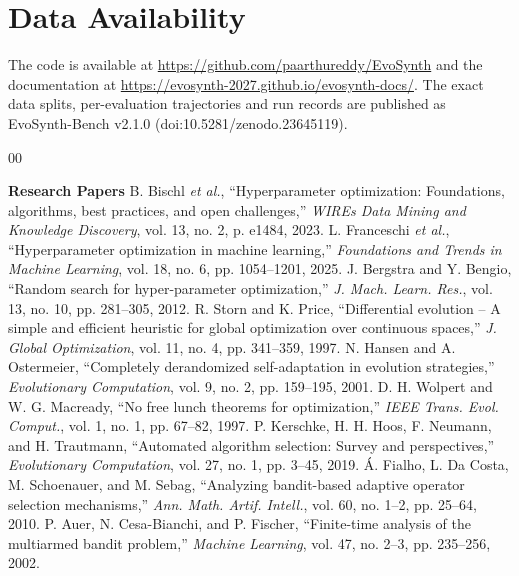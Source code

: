 \documentclass[conference]{IEEEtran}
\begin{document}
\section*{Data Availability}
The code is available at \url{https://github.com/paarthureddy/EvoSynth} and the documentation at \url{https://evosynth-2027.github.io/evosynth-docs/}. The exact data splits, per-evaluation trajectories and run records are published as EvoSynth-Bench v2.1.0 (doi:10.5281/zenodo.23645119).

\begin{thebibliography}{00}
\item[] \textbf{Research Papers}
 B. Bischl \textit{et al.}, ``Hyperparameter optimization: Foundations, algorithms, best practices, and open challenges,'' \textit{WIREs Data Mining and Knowledge Discovery}, vol. 13, no. 2, p. e1484, 2023.
 L. Franceschi \textit{et al.}, ``Hyperparameter optimization in machine learning,'' \textit{Foundations and Trends in Machine Learning}, vol. 18, no. 6, pp. 1054--1201, 2025.
 J. Bergstra and Y. Bengio, ``Random search for hyper-parameter optimization,'' \textit{J. Mach. Learn. Res.}, vol. 13, no. 10, pp. 281--305, 2012.
 R. Storn and K. Price, ``Differential evolution -- A simple and efficient heuristic for global optimization over continuous spaces,'' \textit{J. Global Optimization}, vol. 11, no. 4, pp. 341--359, 1997.
 N. Hansen and A. Ostermeier, ``Completely derandomized self-adaptation in evolution strategies,'' \textit{Evolutionary Computation}, vol. 9, no. 2, pp. 159--195, 2001.
 D. H. Wolpert and W. G. Macready, ``No free lunch theorems for optimization,'' \textit{IEEE Trans. Evol. Comput.}, vol. 1, no. 1, pp. 67--82, 1997.
 P. Kerschke, H. H. Hoos, F. Neumann, and H. Trautmann, ``Automated algorithm selection: Survey and perspectives,'' \textit{Evolutionary Computation}, vol. 27, no. 1, pp. 3--45, 2019.
 {\'A}. Fialho, L. Da Costa, M. Schoenauer, and M. Sebag, ``Analyzing bandit-based adaptive operator selection mechanisms,'' \textit{Ann. Math. Artif. Intell.}, vol. 60, no. 1--2, pp. 25--64, 2010.
 P. Auer, N. Cesa-Bianchi, and P. Fischer, ``Finite-time analysis of the multiarmed bandit problem,'' \textit{Machine Learning}, vol. 47, no. 2--3, pp. 235--256, 2002.

\end{thebibliography}
\end{document}
